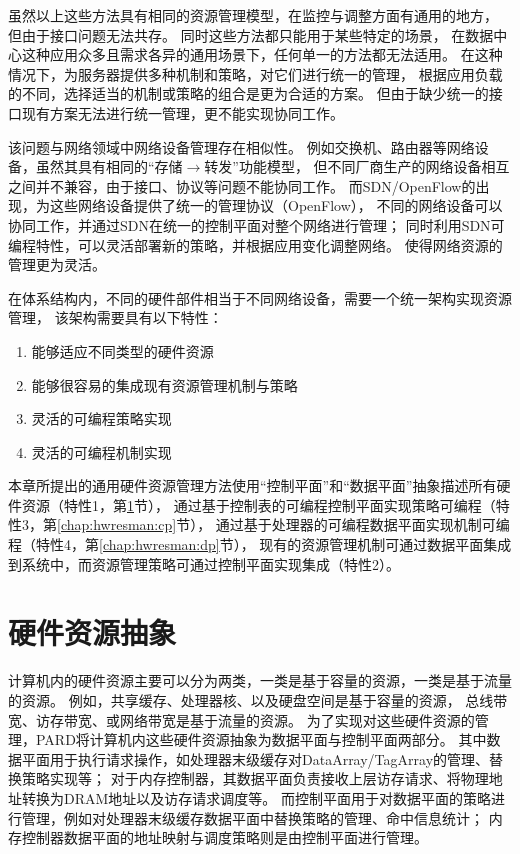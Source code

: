虽然以上这些方法具有相同的资源管理模型，在监控与调整方面有通用的地方，
但由于接口问题无法共存。
同时这些方法都只能用于某些特定的场景，
在数据中心这种应用众多且需求各异的通用场景下，任何单一的方法都无法适用。
在这种情况下，为服务器提供多种机制和策略，对它们进行统一的管理，
根据应用负载的不同，选择适当的机制或策略的组合是更为合适的方案。
但由于缺少统一的接口现有方案无法进行统一管理，更不能实现协同工作。

该问题与网络领域中网络设备管理存在相似性。
例如交换机、路由器等网络设备，虽然其具有相同的``存储$\rightarrow$转发''功能模型，
但不同厂商生产的网络设备相互之间并不兼容，由于接口、协议等问题不能协同工作。
而SDN/OpenFlow的出现，为这些网络设备提供了统一的管理协议（OpenFlow），
不同的网络设备可以协同工作，并通过SDN在统一的控制平面对整个网络进行管理；
同时利用SDN可编程特性，可以灵活部署新的策略，并根据应用变化调整网络。
使得网络资源的管理更为灵活。

在体系结构内，不同的硬件部件相当于不同网络设备，需要一个统一架构实现资源管理，
该架构需要具有以下特性：

\begin{enumerate}[leftmargin=2\parindent, nolistsep, label=\arabic*）]
  \item 能够适应不同类型的硬件资源
  \item 能够很容易的集成现有资源管理机制与策略
  \item 灵活的可编程策略实现
  \item 灵活的可编程机制实现
\end{enumerate}

本章所提出的通用硬件资源管理方法使用``控制平面''和``数据平面''抽象描述所有硬件资源（特性1，第\ref{chap:hwresman:res}节），
通过基于控制表的可编程控制平面实现策略可编程（特性3，第\ref{chap:hwresman:cp}节），
通过基于处理器的可编程数据平面实现机制可编程（特性4，第\ref{chap:hwresman:dp}节），
现有的资源管理机制可通过数据平面集成到系统中，而资源管理策略可通过控制平面实现集成（特性2）。



\section{硬件资源抽象}
\label{chap:hwresman:res}

计算机内的硬件资源主要可以分为两类，一类是基于容量的资源，一类是基于流量的资源。
例如，共享缓存、处理器核、以及硬盘空间是基于容量的资源，
总线带宽、访存带宽、或网络带宽是基于流量的资源。
为了实现对这些硬件资源的管理，PARD将计算机内这些硬件资源抽象为数据平面与控制平面两部分。
其中数据平面用于执行请求操作，如处理器末级缓存对DataArray/TagArray的管理、替换策略实现等；
对于内存控制器，其数据平面负责接收上层访存请求、将物理地址转换为DRAM地址以及访存请求调度等。
而控制平面用于对数据平面的策略进行管理，例如对处理器末级缓存数据平面中替换策略的管理、命中信息统计；
内存控制器数据平面的地址映射与调度策略则是由控制平面进行管理。


